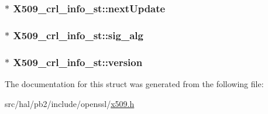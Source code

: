 \subsubsection[{\texorpdfstring{next\+Update}{nextUpdate}}]{$\ast$ X509\+\_\+crl\+\_\+info\+\_\+st\+::next\+Update}\hypertarget{struct_x509__crl__info__st_ac6c7bfd0eb7eb97b75a65ad68ebbea86}{}\label{struct_x509__crl__info__st_ac6c7bfd0eb7eb97b75a65ad68ebbea86}
\subsubsection[{\texorpdfstring{sig\+\_\+alg}{sig_alg}}]{$\ast$ X509\+\_\+crl\+\_\+info\+\_\+st\+::sig\+\_\+alg}\hypertarget{struct_x509__crl__info__st_a9f9d7f31d09d6f5dfd60866725a6d137}{}\label{struct_x509__crl__info__st_a9f9d7f31d09d6f5dfd60866725a6d137}
\subsubsection[{\texorpdfstring{version}{version}}]{$\ast$ X509\+\_\+crl\+\_\+info\+\_\+st\+::version}\hypertarget{struct_x509__crl__info__st_a12cb6a18829a8d4deee72ead8ff4c4e9}{}\label{struct_x509__crl__info__st_a12cb6a18829a8d4deee72ead8ff4c4e9}


The documentation for this struct was generated from the following file\+:\begin{DoxyCompactItemize}
\item 
src/hal/pb2/include/openssl/\hyperlink{x509_8h}{x509.\+h}\end{DoxyCompactItemize}
